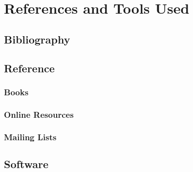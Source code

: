 \documentclass[a4paper,12pt]{report}
\begin{document}
\chapter{References and Tools Used}

\section{Bibliography}

\section{Reference}

%

\subsection{Books}



\subsection{Online Resources}



\subsection{Mailing Lists}

%

\section{Software}


\end{document}
